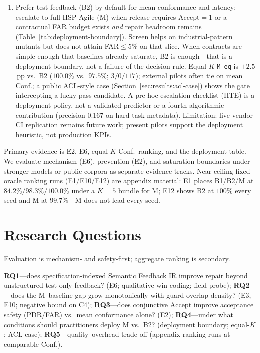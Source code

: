 \begin{enumerate}
  \item[\textbf{C4.}]
    Prefer test-feedback (B2) by default for mean conformance and latency;
    escalate to full HSP-Agile (M) when release requires
    $\mathrm{Accept}{=}1$ or a contractual FAR budget exists \emph{and}
    repair headroom remains (Table~\ref{tab:deployment-boundary}).
    Screen helps on industrial-pattern mutants but does not attain
    FAR${\le}5\%$ on that slice.
    When contracts are simple enough that baselines already saturate, B2 is
    enough---that is a deployment boundary, not a failure of the decision
    rule.
    Equal-$K$ \texttt{M\_eq} is ${+}2.5$\,pp vs.\ B2 ($100.0\%$ vs.\ $97.5\%$;
    $3/0/117$); external pilots often tie on mean Conf.; a public ACL-style
    case (Section~\ref{sec:results:acl-case}) shows the gate intercepting a
    lucky-pass candidate.
    A pre-hoc escalation checklist (HTE) is a deployment policy, not a
    validated predictor or a fourth algorithmic contribution (precision
    0.167 on hard-task metadata).
    Limitation: live vendor CI replication remains future work; present
    pilots support the deployment heuristic, not production KPIs.
\end{enumerate}

Primary evidence is E2, E6, equal-$K$ Conf.\ ranking, and the deployment table.
We evaluate mechanism (E6), prevention (E2), and saturation boundaries under
stronger models or public corpora as separate evidence tracks.
Near-ceiling fixed-oracle ranking runs (E1/E10/E12) are appendix material:
E1 places B1/B2/M at $84.2\%/98.3\%/100.0\%$ under a $K{=}5$ bundle for M;
E12 shows B2 at $100\%$ every seed and M at $99.7\%$---M does not lead every
seed.


\section{Research Questions}
\label{sec:intro:rq}

Evaluation is mechanism- and safety-first; aggregate ranking is secondary.

\textbf{RQ1}---does specification-indexed Semantic Feedback IR improve repair
beyond unstructured test-only feedback? (E6; qualitative win coding; field
probe);
\textbf{RQ2}---does the M--baseline gap grow monotonically with guard-overlap
density? (E3, E10; negative bound on C4);
\textbf{RQ3}---does conjunctive $\mathrm{Accept}$ improve acceptance safety
(PDR/FAR) vs.\ mean conformance alone? (E2);
\textbf{RQ4}---under what conditions should practitioners deploy M vs.\ B2?
(deployment boundary; equal-$K$; ACL case);
\textbf{RQ5}---quality--overhead trade-off (appendix ranking runs at
comparable Conf.).


